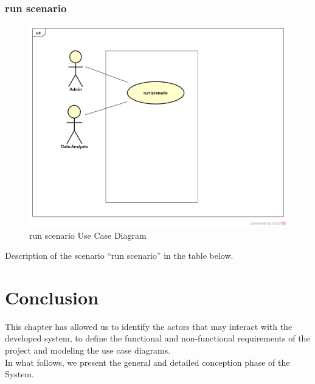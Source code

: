 \documentclass[12pt]{article}
\begin{document}
	 \subsubsection{run scenario}
	 	\begin{figure}[h]
	 	\centering
	 	\includegraphics[width=1.0\textwidth]{runScenario.png}
	 	\caption{run scenario Use Case Diagram}
	 	
	 \end{figure}
	 Description of the scenario ``run scenario'' in the table below.
	
	\clearpage
	\newpage
	
	\section{Conclusion}
	This chapter has allowed us to identify the actors that may interact with the developed system, to define the functional and non-functional requirements of the project and modeling the use case diagrams.
	\\
	In what follows, we present the general and detailed conception phase of the System.  
	
\end{document}
